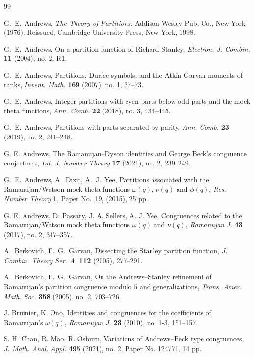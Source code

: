 \documentclass[12pt,reqno]{amsart}
\numberwithin{equation}{section}
\theoremstyle{plain}
\theoremstyle{definition}
\begin{document}
\begin{thebibliography}{99}


G.~E.~Andrews,
\textit{The Theory of Partitions}. Addison-Wesley Pub. Co., New York (1976).
Reissued, Cambridge University Press, New York, 1998.


G.~E.~Andrews,
On a partition function of Richard Stanley,
\textit{Electron. J. Combin.} \textbf{11} (2004), no. 2, R1.

G.~E.~Andrews,
Partitions, Durfee symbols, and the Atkin-Garvan moments of ranks,
\textit{Invent. Math.} \textbf{169} (2007), no. 1, 37--73.


G.~E.~Andrews,
Integer partitions with even parts below odd parts and the mock theta functions,
\textit{Ann. Comb.} \textbf{22} (2018), no. 3, 433--445.


G.~E.~Andrews,
Partitions with parts separated by parity,
\textit{Ann. Comb.} \textbf{23} (2019), no. 2, 241--248.


G. E. Andrews,
The Ramanujan--Dyson identities and George Beck's congruence conjectures,
\textit{Int. J. Number Theory} \textbf{17} (2021), no. 2, 239--249.


G.~E.~Andrews, A.~Dixit, A.~J.~Yee,
Partitions associated with the Ramanujan/Watson mock theta functions
$\omega(q)$, $\nu(q)$ and $\phi(q)$,
\textit{Res. Number Theory} \textbf{1}, Paper No.~19, (2015), 25 pp.


G. E. Andrews, D. Passary, J. A. Sellers, A. J. Yee,
Congruences related to the Ramanujan/Watson mock theta functions
$\omega(q)$ and $\nu(q)$,
\textit{Ramanujan J.} \textbf{43} (2017), no. 2, 347--357.


A.~Berkovich, F.~G.~Garvan,
Dissecting the Stanley partition function,
\textit{J. Combin. Theory Ser. A.} {\bf 112} (2005), 277--291.


A.~Berkovich, F.~G.~Garvan,
On the Andrews--Stanley refinement of Ramanujan's partition congruence
modulo $5$ and generalizations,
\textit{Trans. Amer. Math. Soc.} \textbf{358} (2005), no. 2, 703--726.


J. Bruinier, K. Ono,
Identities and congruences for the coefficients of Ramanujan's $\omega(q)$,
\textit{Ramanujan J.} \textbf{23} (2010), no. 1-3, 151--157.


S. H. Chan, R. Mao, R. Osburn,
Variations of Andrews--Beck type congruences,
\textit{J. Math. Anal. Appl.} \textbf{495} (2021), no. 2, Paper No. 124771, 14 pp.



\end{thebibliography}
\end{document}
